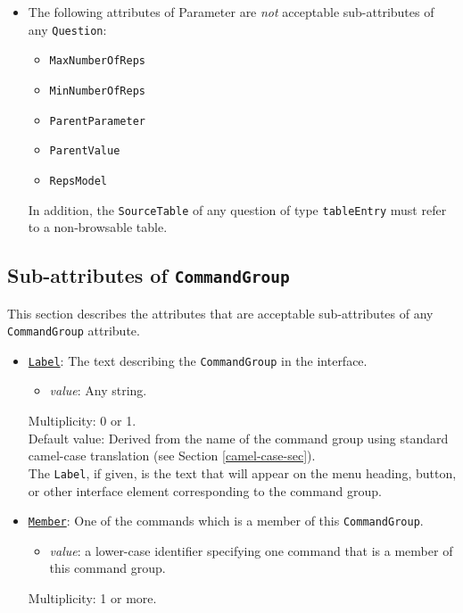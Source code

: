 \documentclass[11pt]{article}
\begin{document}
\begin{itemize}
\item The following attributes of Parameter are {\it not} acceptable
  sub-attributes of any {\tt Question}:
  \begin{itemize}
  \item{} {\tt MaxNumberOfReps}
  \item{} {\tt MinNumberOfReps}
  \item{} {\tt ParentParameter}
  \item{} {\tt ParentValue}
  \item{} {\tt RepsModel}
  \end{itemize}
  In addition, the {\tt SourceTable} of any question of type
  {\tt tableEntry} must refer to a non-browsable table.

\end{itemize}


\subsection{Sub-attributes of {\tt CommandGroup}}
\label{sub-attr-command-group-sec}

This section describes the attributes that are acceptable
sub-attributes of any {\tt CommandGroup} attribute.

\begin{itemize}

\item \underline{\tt Label}:  The text describing the {\tt CommandGroup}
in the interface.
\begin{itemize}
\item {\it value}: Any string.
\end{itemize}
Multiplicity: 0 or 1. \\
Default value: Derived from the name of the command group using standard
camel-case translation (see Section \ref{camel-case-sec}). \\
The {\tt Label}, if given, is the text that will appear
on the menu heading, button,
or other interface element corresponding to the command group.

\item \underline{\tt Member}:  One of the commands which is
a member of this {\tt CommandGroup}.
\begin{itemize}
\item {\it value}: a lower-case identifier specifying one
  command that is a member of this command group.
\end{itemize}
Multiplicity: 1 or more.

\end{itemize}
\end{document}
